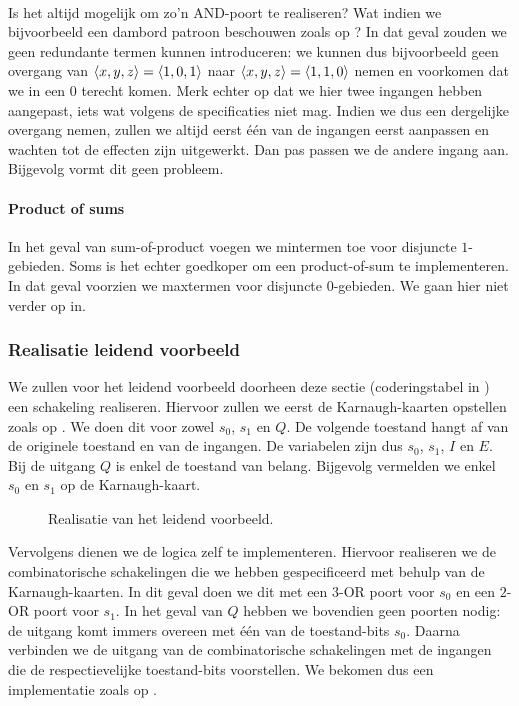 \paragraph{}
Is het altijd mogelijk om zo'n AND-poort te realiseren? Wat indien we bijvoorbeeld een dambord patroon beschouwen zoals op ?
In dat geval zouden we geen redundante termen kunnen introduceren: we kunnen dus bijvoorbeeld geen overgang van $\left\langle x,y,z \right\rangle=\left\langle 1,0,1 \right\rangle$ naar $\left\langle x,y,z \right\rangle=\left\langle 1,1,0 \right\rangle$ nemen en voorkomen dat we in een $0$ terecht komen. Merk echter op dat we hier twee ingangen hebben aangepast, iets wat volgens de specificaties niet mag. Indien we dus een dergelijke overgang nemen, zullen we altijd eerst \'e\'en van de ingangen eerst aanpassen en wachten tot de effecten zijn uitgewerkt. Dan pas passen we de andere ingang aan. Bijgevolg vormt dit geen probleem.
\paragraph{Product of sums}
In het geval van sum-of-product voegen we mintermen toe voor disjuncte $1$-gebieden. Soms is het echter goedkoper om een product-of-sum te implementeren. In dat geval voorzien we maxtermen voor disjuncte $0$-gebieden. We gaan hier niet verder op in.
\subsubsection{Realisatie leidend voorbeeld}
We zullen voor het leidend voorbeeld doorheen deze sectie (coderingstabel in ) een schakeling realiseren. Hiervoor zullen we eerst de Karnaugh-kaarten opstellen zoals op . We doen dit voor zowel $s_0$, $s_1$ en $Q$. De volgende toestand hangt af van de originele toestand en van de ingangen. De variabelen zijn dus $s_0$, $s_1$, $I$ en $E$. Bij de uitgang $Q$ is enkel de toestand van belang. Bijgevolg vermelden we enkel $s_0$ en $s_1$ op de Karnaugh-kaart.
\begin{figure}[hbt]
\centering
{}
\caption{Realisatie van het leidend voorbeeld.}
\end{figure}
Vervolgens dienen we de logica zelf te implementeren. Hiervoor realiseren we de combinatorische schakelingen die we hebben gespecificeerd met behulp van de Karnaugh-kaarten. In dit geval doen we dit met een $3$-OR poort voor $s_0$ en een $2$-OR poort voor $s_1$. In het geval van $Q$ hebben we bovendien geen poorten nodig: de uitgang komt immers overeen met \'e\'en van de toestand-bits $s_0$. Daarna verbinden we de uitgang van de combinatorische schakelingen met de ingangen die de respectievelijke toestand-bits voorstellen. We bekomen dus een implementatie zoals op .

